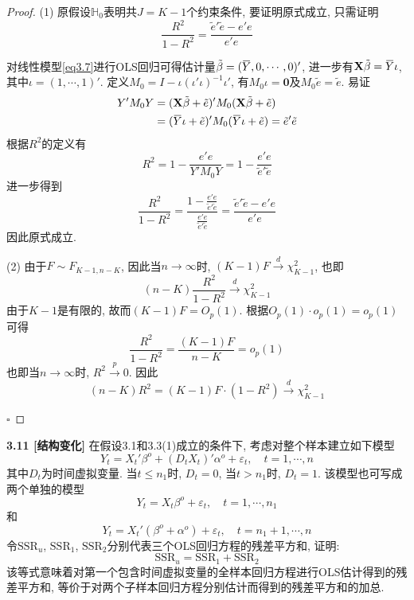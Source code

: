 \documentclass[cn,12pt,math=mtpro2,citestyle=gb7714-2015,bibstyle=gb7714-2015,twocol,mode=simple]{elegantbook}
\newcommand{\overbar}[1]{\mkern 1.5mu\overline{\mkern-1.5mu#1\mkern-1.5mu}\mkern 1.5mu}
\newcommand{\tbeta}{\tilde{\beta}}
\begin{document}
\begin{proof}
  (1) 原假设$\mathbb{H}_0$表明共$J=K-1$个约束条件, 要证明原式成立, 只需证明
  $$\frac{R^2}{1-R^2}=\frac{\tilde{e}'\tilde{e}-e'e}{e'e}$$

  对线性模型\ref{eq3.7}进行OLS回归可得估计量$\tbeta=(\overbar{Y},0,\cdots,0)'$, 进一步有$\mathbf{X}\tbeta=\overbar{Y}\iota$, 其中$\iota=(1,\cdots,1)'$.
  定义$M_0=I-\iota(\iota'\iota)^{-1}\iota'$, 有$M_0\iota=\mathbf{0}$及$M_0\tilde{e}=\tilde{e}$. 易证
  \begin{align*}
  Y'M_0Y&=(\mathbf{X}\tbeta+\tilde{e})'M_0(\mathbf{X}\tbeta+\tilde{e}) \\
  &=(\overbar{Y}\iota+\tilde{e})'M_0(\overbar{Y}\iota+\tilde{e})=\tilde{e}'\tilde{e}
  \end{align*}
  根据$R^2$的定义有
  $$R^2=1-\frac{e'e}{Y'M_0Y}=1-\frac{e'e}{\tilde{e}{'}\tilde{e}}$$
  进一步得到
  $$\frac{R^2}{1-R^2}=\frac{\displaystyle 1-\frac{e'e}{\tilde{e}'\tilde{e}}}{\displaystyle \frac{e'e}{\tilde{e}'\tilde{e}}}=\frac{\tilde{e}'\tilde{e}-e'e}{e'e}$$
  因此原式成立.

  (2) 由于$F \sim F_{K-1, n-K}$, 因此当$n \rightarrow \infty$时, $(K-1)F \xrightarrow{d} \chi^2_{K-1}$, 也即
  $$(n-K)\frac{R^2}{1-R^2}\xrightarrow{d} \chi^2_{K-1}$$
  由于$K-1$是有限的, 故而$(K-1)F=O_p(1)$. 根据$O_p(1)\cdot o_p(1)=o_p(1)$可得
  $$\frac{R^2}{1-R^2}=\frac{(K-1)F}{n-K}=o_p(1)$$
  也即当$n\rightarrow\infty$时, $R^2 \xrightarrow{p} 0$. 因此
  $$(n-K)R^2=(K-1)F\cdot(1-R^2) \xrightarrow{d} \chi^2_{K-1}$$

  $\square$
\end{proof}

\textbf{3.11 [结构变化]} 在假设3.1和3.3(1)成立的条件下, 考虑对整个样本建立如下模型
$$Y_t=X_t'\beta^o+(D_tX_t)'\alpha^o+\varepsilon_t,\quad t=1,\cdots,n$$
其中$D_t$为时间虚拟变量. 当$t\leq n_1$时, $D_t=0$, 当$t>n_1$时, $D_t=1$. 该模型也可写成两个单独的模型
$$Y_t=X_t\beta^o+\varepsilon_t,\quad t=1,\cdots,n_1$$
和
$$Y_t=X_t'(\beta^o+\alpha^o)+\varepsilon_t,\quad t=n_1+1,\cdots,n$$
令$\text{SSR}_u$, $\text{SSR}_1$, $\text{SSR}_2$分别代表三个OLS回归方程的残差平方和, 证明:
$$\text{SSR}_u=\text{SSR}_1+\text{SSR}_2$$
该等式意味着对第一个包含时间虚拟变量的全样本回归方程进行OLS估计得到的残差平方和, 等价于对两个子样本回归方程分别估计而得到的残差平方和的加总.
\end{document}
